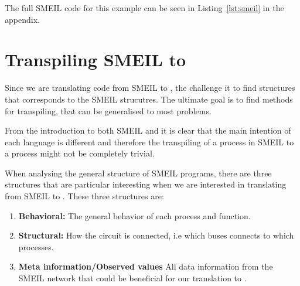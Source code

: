 The full SMEIL code for this example can be seen in Listing~\ref{lst:smeil} in  the appendix.

\section{Transpiling SMEIL to \cspm{}}
\label{sec:transpiling}
Since we are translating code from SMEIL to \cspm{}, the challenge it to find \cspm{} structures that corresponds to the SMEIL strucutres. The ultimate goal is to find methods for transpiling, that can be generalised to most problems.

From the introduction to both SMEIL and \cspm it is clear that the main intention of each language is different and therefore the transpiling of a process in SMEIL to a \cspm process might not be completely trivial.







When analysing the general structure of SMEIL programs, there are three structures that are particular interesting when we are interested in translating from SMEIL to \cspm{}. These three structures are:
\begin{enumerate}
    \item \textbf{Behavioral:} The general behavior of each process and function.
    \item \textbf{Structural:} How the circuit is connected, i.e which buses connects to which processes.
    \item \textbf{Meta information/Observed values} %
    All data information from the SMEIL network that could be beneficial for our translation to \cspm{}.
\end{enumerate}

